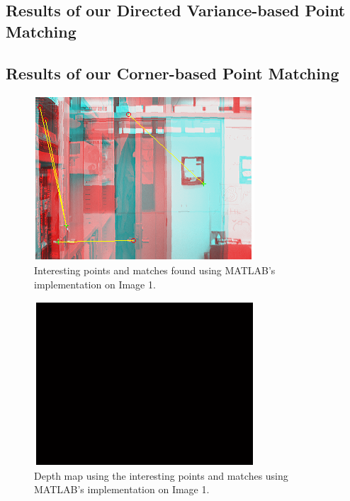 \subsection{Results of our Directed Variance-based Point Matching}

\subsection{Results of our Corner-based Point Matching}
\begin{figure}[h!]\centering
	\includegraphics[width=0.9\linewidth]{Images/01_matlab_match.png}
	\caption{Interesting points and matches found using MATLAB's implementation on Image 1.}
	\label{fig:grid-example}
\end{figure}

\begin{figure}[h!]\centering
	\includegraphics[width=0.9\linewidth]{Images/01_matlab_depth.png}
	\caption{Depth map using the interesting points and matches using MATLAB's implementation on Image 1.}
	\label{fig:grid-example}
\end{figure}

